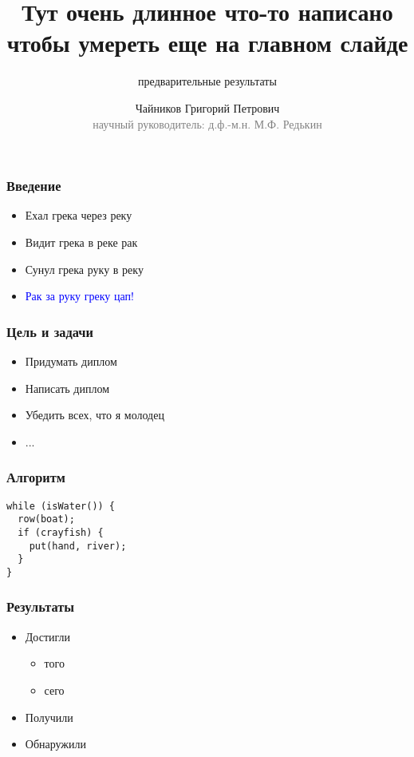 \documentclass{beamer}
\begin{document}
\title[Короткое название]{Тут очень длинное что-то написано чтобы умереть еще на главном слайде}
\subtitle{предварительные результаты}
\author[Чайников Г.П.]{Чайников Григорий Петрович\\{\footnotesize\textcolor{gray}{научный руководитель: д.ф.-м.н. М.Ф. Редькин}}}
\frame{\titlepage}

\begin{frame}\frametitle{Введение}
\begin{itemize}
    \item Ехал грека через реку
    \item Видит грека в реке рак
    \item Сунул грека руку в реку
    \item<2-> {\Large \textcolor{blue}{Рак за руку греку цап!}}
\end{itemize}
\end{frame}

\begin{frame}\frametitle{Цель и задачи}
\begin{itemize}
    \item Придумать диплом
    \item Написать диплом
    \item Убедить всех, что я молодец
    \item ...
\end{itemize}
\end{frame}


\lstset{language=java}
\begin{frame}[fragile]\frametitle{Алгоритм}
\begin{lstlisting}
while (isWater()) {
  row(boat);
  if (crayfish) {
    put(hand, river);
  }
}
\end{lstlisting}
\end{frame}

\begin{frame}\frametitle{Результаты}
\Large
\begin{itemize}
    \item Достигли
    \begin{itemize}
        \item того
        \item сего
    \end{itemize}
    \item Получили
    \item Обнаружили
\end{itemize}
\end{frame}
\end{document}
